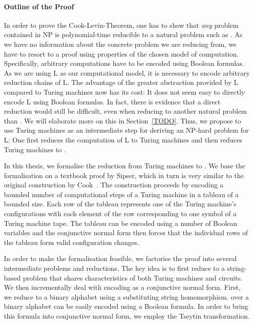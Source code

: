 \paragraph{Outline of the Proof}
In order to prove the Cook-Levin-Theorem, one has to show that \emph{any} problem contained in NP is polynomial-time reducible to a natural problem such as \SAT{}. 
As we have no information about the concrete problem we are reducing from, we have to resort to a proof using properties of the chosen model of computation. 
Specifically, arbitrary computations have to be encoded using Boolean formulas.
As we are using L as our computational model, it is necessary to encode arbitrary reduction chains of L. The advantage of the greater abstraction provided by L compared to Turing machines now has its cost: It does not seem easy to directly encode L using Boolean formulas. In fact, there is evidence that a direct reduction would still be difficult, even when reducing to another natural problem than \SAT{}. We will elaborate more on this in Section~\ref{TODO}.
Thus, we propose to use Turing machines as an intermediate step for deriving an NP-hard problem for L: One first reduces the computation of L to Turing machines and then reduces Turing machines to \SAT{}. 

In this thesis, we formalise the reduction from Turing machines to \SAT{}. We base the formalisation on a textbook proof by Sipser\cite{Sipser:TheoryofComputation}, which in turn is very similar to the original construction by Cook~\cite{cook_theorem}. The construction proceeds by encoding a bounded number of computational steps of a Turing machine in a tableau of a bounded size. 
Each row of the tableau represents one of the Turing machine's configurations with each element of the row corresponding to one symbol of a Turing machine tape. The tableau can be encoded using a number of Boolean variables and the conjunctive normal form then forces that the individual rows of the tableau form valid configuration changes.

In order to make the formalisation feasible, we factorise the proof into several intermediate problems and reductions. The key idea is to first reduce to a string-based problem \PR{} that shares characteristics of both Turing machines and circuits. 
We then incrementally deal with encoding \PR{} as a conjunctive normal form. First, we reduce to a binary alphabet using a substituting string homomorphism. 
\PR{} over a binary alphabet can be easily encoded using a Boolean formula. In order to bring this formula into conjunctive normal form, we employ the Tseytin transformation.

